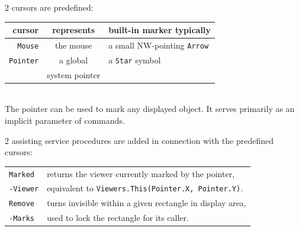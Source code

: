 2 cursors are predefined:
\begin{table}[h!]
  \centering
  \begin{tabular}{r c l}
    cursor         & represents & \small{built-in }marker\small{ typically} \\\hline
    \verb|Mouse|   & the mouse  & \small{a small NW-pointing }\verb|Arrow| \\
    \verb|Pointer| &  a global  & \small{a }\verb|Star|\small{ symbol} \\
                   & \small{system pointer}
  \end{tabular}
\end{table}
\\The pointer can be used to mark any displayed object.
It serves primarily as an implicit parameter of commands.

2 assisting service procedures are added in connection with the predefined cursors:
\begin{table}[h!]
  \setlength{\tabcolsep}{3pt}
  \begin{tabular}{l|l}
    \verb|Marked| & \small{returns the viewer currently marked by the pointer,} \\
    \verb|-Viewer|& \small{equivalent to \verb|Viewers.This(Pointer.X, Pointer.Y)|.} \\\hline
    \verb|Remove| & \small{turns invisible within a given rectangle in display area,} \\
    \verb|-Marks| & \small{used to lock the rectangle for its caller.}
  \end{tabular}
\end{table}

